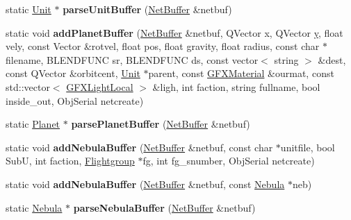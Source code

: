 \begin{DoxyCompactItemize}
\item 
static \hyperlink{classUnit}{Unit} $\ast$ {\bfseries parse\+Unit\+Buffer} (\hyperlink{classNetBuffer}{Net\+Buffer} \&netbuf)\hypertarget{classUnitFactory_a26e5a2bdbbc9b9e1cfe1969fefa00416}{}\label{classUnitFactory_a26e5a2bdbbc9b9e1cfe1969fefa00416}

\item 
static void {\bfseries add\+Planet\+Buffer} (\hyperlink{classNetBuffer}{Net\+Buffer} \&netbuf, Q\+Vector x, Q\+Vector \hyperlink{IceUtils_8h_aa7ffaed69623192258fb8679569ff9ba}{y}, float vely, const Vector \&rotvel, float pos, float gravity, float radius, const char $\ast$filename, B\+L\+E\+N\+D\+F\+U\+NC sr, B\+L\+E\+N\+D\+F\+U\+NC ds, const vector$<$ string $>$ \&dest, const Q\+Vector \&orbitcent, \hyperlink{classUnit}{Unit} $\ast$parent, const \hyperlink{structGFXMaterial}{G\+F\+X\+Material} \&ourmat, const std\+::vector$<$ \hyperlink{structGFXLightLocal}{G\+F\+X\+Light\+Local} $>$ \&ligh, int faction, string fullname, bool inside\+\_\+out, Obj\+Serial netcreate)\hypertarget{classUnitFactory_a3eeb791edf9648138d8823302330c534}{}\label{classUnitFactory_a3eeb791edf9648138d8823302330c534}

\item 
static \hyperlink{classPlanet}{Planet} $\ast$ {\bfseries parse\+Planet\+Buffer} (\hyperlink{classNetBuffer}{Net\+Buffer} \&netbuf)\hypertarget{classUnitFactory_ae8970f2f67c6d508f5babc81b9561450}{}\label{classUnitFactory_ae8970f2f67c6d508f5babc81b9561450}

\item 
static void {\bfseries add\+Nebula\+Buffer} (\hyperlink{classNetBuffer}{Net\+Buffer} \&netbuf, const char $\ast$unitfile, bool SubU, int faction, \hyperlink{classFlightgroup}{Flightgroup} $\ast$fg, int fg\+\_\+snumber, Obj\+Serial netcreate)\hypertarget{classUnitFactory_a00ae7ad25a5c70d7dce7269023076462}{}\label{classUnitFactory_a00ae7ad25a5c70d7dce7269023076462}

\item 
static void {\bfseries add\+Nebula\+Buffer} (\hyperlink{classNetBuffer}{Net\+Buffer} \&netbuf, const \hyperlink{classNebula}{Nebula} $\ast$neb)\hypertarget{classUnitFactory_a28a67a6e6c63c21123448e1e0c2abd4c}{}\label{classUnitFactory_a28a67a6e6c63c21123448e1e0c2abd4c}

\item 
static \hyperlink{classNebula}{Nebula} $\ast$ {\bfseries parse\+Nebula\+Buffer} (\hyperlink{classNetBuffer}{Net\+Buffer} \&netbuf)\hypertarget{classUnitFactory_a25a0a90658ac97ff80507ea3628e2aca}{}\label{classUnitFactory_a25a0a90658ac97ff80507ea3628e2aca}


\end{DoxyCompactItemize}
